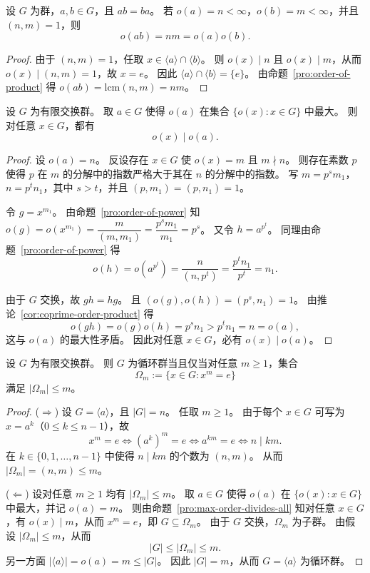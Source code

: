 \documentclass[lang=cn,a4paper,newtx]{elegantbook}
\begin{document}
\begin{corollary}\label{coprime-order-product}
  设 $G$ 为群，$a,b\in G$，且 $ab=ba$。
  若 $o(a)=n<\infty$，$o(b)=m<\infty$，并且 $(n,m)=1$，则
  \[
    o(ab)=nm=o(a)o(b).
  \]
\end{corollary}

\begin{proof}
  由于 $(n,m)=1$，任取 $x\in\langle a\rangle\cap\langle b\rangle$。
  则 $o(x)\mid n$ 且 $o(x)\mid m$，从而 $o(x)\mid (n,m)=1$，故 $x=e$。
  因此 $\langle a\rangle\cap\langle b\rangle=\{e\}$。
  由命题~\ref{pro:order-of-product} 得 $o(ab)=\mathrm{lcm}(n,m)=nm$。
\end{proof}

\begin{proposition}\label{max-order-divides-all}
  设 $G$ 为有限交换群。
  取 $a\in G$ 使得 $o(a)$ 在集合 $\{o(x):x\in G\}$ 中最大。
  则对任意 $x\in G$，都有
  \[
    o(x)\mid o(a).
  \]
\end{proposition}

\begin{proof}
  设 $o(a)=n$。
  反设存在 $x\in G$ 使 $o(x)=m$ 且 $m\nmid n$。
  则存在素数 $p$ 使得 $p$ 在 $m$ 的分解中的指数严格大于其在 $n$ 的分解中的指数。
  写 $m=p^s m_1$，$n=p^t n_1$，其中 $s>t$，并且 $(p,m_1)=(p,n_1)=1$。

  令 $g=x^{m_1}$。
  由命题~\ref{pro:order-of-power} 知 $o(g)=o(x^{m_1})=\dfrac{m}{(m,m_1)}=\dfrac{p^s m_1}{m_1}=p^s$。
  又令 $h=a^{p^t}$。
  同理由命题~\ref{pro:order-of-power} 得
  \[
    o(h)=o(a^{p^t})=\frac{n}{(n,p^t)}=\frac{p^t n_1}{p^t}=n_1.
  \]

  由于 $G$ 交换，故 $gh=hg$。
  且 $(o(g),o(h))=(p^s,n_1)=1$。
  由推论~\ref{cor:coprime-order-product} 得
  \[
    o(gh)=o(g)o(h)=p^s n_1>p^t n_1=n=o(a),
  \]
  这与 $o(a)$ 的最大性矛盾。
  因此对任意 $x\in G$，必有 $o(x)\mid o(a)$。
\end{proof}

\begin{proposition}[有限交换群的循环判别]\label{cyclic-criterion}
  设 $G$ 为有限交换群。
  则 $G$ 为循环群当且仅当对任意 $m\ge 1$，集合
  \[
    \Omega_m:=\{x\in G:x^m=e\}
  \]
  满足 $|\Omega_m|\le m$。
\end{proposition}

\begin{proof}
  ($\Rightarrow$)
  设 $G=\langle a\rangle$，且 $|G|=n$。
  任取 $m\ge 1$。
  由于每个 $x\in G$ 可写为 $x=a^k$（$0\le k\le n-1$），故
  \[
    x^m=e\iff (a^k)^m=e\iff a^{km}=e\iff n\mid km.
  \]
  在 $k\in\{0,1,\dots,n-1\}$ 中使得 $n\mid km$ 的个数为 $(n,m)$。
  从而 $|\Omega_m|=(n,m)\le m$。

  ($\Leftarrow$)
  设对任意 $m\ge 1$ 均有 $|\Omega_m|\le m$。
  取 $a\in G$ 使得 $o(a)$ 在 $\{o(x):x\in G\}$ 中最大，并记 $o(a)=m$。
  则由命题~\ref{pro:max-order-divides-all} 知对任意 $x\in G$，有 $o(x)\mid m$，从而 $x^m=e$，即 $G\subseteq \Omega_m$。
  由于 $G$ 交换，$\Omega_m$ 为子群。
  由假设 $|\Omega_m|\le m$，从而
  \[
    |G|\le |\Omega_m|\le m.
  \]
  另一方面 $|\langle a\rangle|=o(a)=m\le |G|$。
  因此 $|G|=m$，从而 $G=\langle a\rangle$ 为循环群。
\end{proof}
\end{document}
